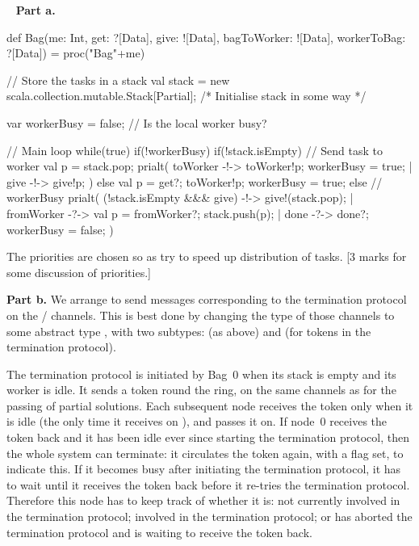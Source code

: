 \begin{question}


\end{question}



\begin{answer} \mbox{ }
{\bf Part a.}
%
\begin{scala}
  def Bag(me: Int, get: ?[Data], give: ![Data], 
          bagToWorker: ![Data], workerToBag: ?[Data]) 
  = proc("Bag"+me){
    // Store the tasks in a stack
    val stack = new scala.collection.mutable.Stack[Partial];
    /* Initialise stack in some way */

    var workerBusy = false; // Is the local worker busy?
 
    // Main loop
    while(true){
      if(!workerBusy)
        if(!stack.isEmpty){ // Send task to worker
	  val p = stack.pop; 
	  prialt(
	    toWorker -!-> { toWorker!p; workerBusy = true; }
	    | give -!-> { give!p; }
	  )
	} 
	else{ val p = get?; toWorker!p; workerBusy = true; }
      else // workerBusy
        prialt(
	  (!stack.isEmpty &&& give) -!-> { give!(stack.pop); }
	  | fromWorker -?-> { 
              val p = fromWorker?; stack.push(p); 
            }
	  | done -?-> { done?; workerBusy = false; }
	)
      }
    }
\end{scala}
%
The priorities are chosen so as try to speed up distribution of tasks.
[3 marks for some discussion of priorities.]


\noindent
{\bf Part b.}
%
We arrange to send messages corresponding to the termination protocol on the
/ channels.  This is best done by changing the type of
those channels to some abstract type , with two subtypes:
 (as above) and  (for tokens in the termination
protocol). 

The termination protocol is initiated by Bag~0 when its stack is empty and its
worker is idle.  It sends a  token round the ring, on the
same channels as for the passing of partial solutions.  Each subsequent node
receives the token only when it is idle (the only time it receives on
), and passes it on.  If node~0 receives the token back and it has
been idle ever since starting the termination protocol, then the whole system
can terminate: it circulates the token again, with a flag set, to indicate
this.  If it becomes busy after initiating the termination protocol, it has to
wait until it receives the token back before it re-tries the termination
protocol.  Therefore this node has to keep track of whether it is: not
currently involved in the termination protocol; involved in the termination
protocol; or has aborted the termination protocol and is waiting to receive
the token back.


\end{answer}
